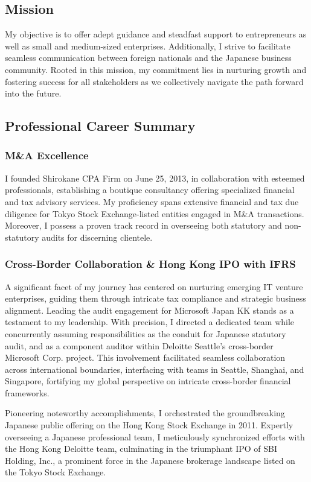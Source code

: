 \subsection{Mission}
My objective is to offer adept guidance and steadfast support to entrepreneurs as well as small and medium-sized enterprises. Additionally, I strive to facilitate seamless communication between foreign nationals and the Japanese business community. Rooted in this mission, my commitment lies in nurturing growth and fostering success for all stakeholders as we collectively navigate the path forward into the future.

\subsection{Professional Career Summary}

\subsubsection{M\&A Excellence}
I founded Shirokane CPA Firm on June 25, 2013, in collaboration with esteemed professionals, establishing a boutique consultancy offering specialized financial and tax advisory services. My proficiency spans extensive financial and tax due diligence for Tokyo Stock Exchange-listed entities engaged in M\&A transactions. Moreover, I possess a proven track record in overseeing both statutory and non-statutory audits for discerning clientele.

\subsubsection{Cross-Border Collaboration \& Hong Kong IPO with IFRS}
A significant facet of my journey has centered on nurturing emerging IT venture enterprises, guiding them through intricate tax compliance and strategic business alignment. Leading the audit engagement for Microsoft Japan KK stands as a testament to my leadership. With precision, I directed a dedicated team while concurrently assuming responsibilities as the conduit for Japanese statutory audit, and as a component auditor within Deloitte Seattle's cross-border Microsoft Corp. project. This involvement facilitated seamless collaboration across international boundaries, interfacing with teams in Seattle, Shanghai, and Singapore, fortifying my global perspective on intricate cross-border financial frameworks.

Pioneering noteworthy accomplishments, I orchestrated the groundbreaking Japanese public offering on the Hong Kong Stock Exchange in 2011. Expertly overseeing a Japanese professional team, I meticulously synchronized efforts with the Hong Kong Deloitte team, culminating in the triumphant IPO of SBI Holding, Inc., a prominent force in the Japanese brokerage landscape listed on the Tokyo Stock Exchange.

